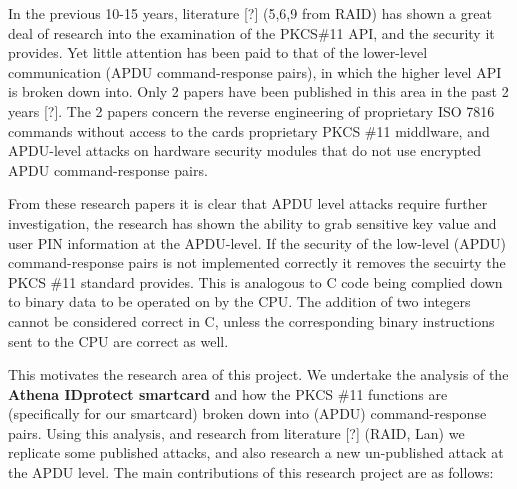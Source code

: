 \documentclass[bsc,frontabs,twoside,singlespacing,parskip,deptreport]{infthesis}     %
\begin{document}
In the previous 10-15 years, literature [?] (5,6,9 from RAID) has shown a great deal of research into the examination of the PKCS\#11 API, and the security it provides. Yet little attention has been paid to that of the lower-level communication (APDU command-response pairs), in which the higher level API is broken down into. Only 2 papers have been published in this area in the past 2 years [?]. The 2 papers concern the reverse engineering of proprietary ISO 7816 commands without access to the cards proprietary PKCS \#11 middlware, and APDU-level attacks on hardware security modules that do not use encrypted APDU command-response pairs.

From these research papers it is clear that APDU level attacks require further investigation, the research has shown the ability to grab sensitive key value and user PIN information at the APDU-level. If the security of the low-level (APDU) command-response pairs is not implemented correctly it removes the secuirty the PKCS \#11 standard provides. This is analogous to C code being complied down to binary data to be operated on by the CPU. The addition of two integers cannot be considered correct in C, unless the corresponding binary instructions sent to the CPU are correct as well.

This motivates the research area of this project. We undertake the analysis of the \textbf{Athena IDprotect smartcard} and how the PKCS \#11 functions are (specifically for our smartcard) broken down into (APDU) command-response pairs. Using this analysis, and research from literature [?] (RAID, Lan) we replicate some published attacks, and also research a new un-published attack at the APDU level. The main contributions of this research project are as follows:
\end{document}
